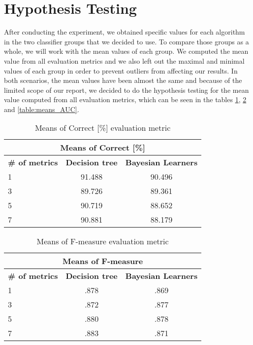 \section{Hypothesis Testing}
After conducting the experiment, we obtained specific values for each algorithm in the two classifier groups that we decided to use. To compare those groups as a whole, we will work with the mean values of each group. We computed the mean value from all evaluation metrics and we also left out the maximal and minimal values of each group in order to prevent outliers from affecting our results. In both scenarios, the mean values have been almost the same and because of the limited scope of our report, we decided to do the hypothesis testing for the mean value computed from all evaluation metrics, which can be seen in the tables \ref{table:means_correct}, \ref{table:means_F-measure} and \ref{table:means_AUC}.
\begin{table}[h!]
\centering
\begin{tabular}{ |l|c|c| }
\hline
\multicolumn{3}{|c|}{\textbf{Means of Correct [\%]}}\\
 \hline
 \textbf{\# of metrics} & \textbf{Decision tree} & \textbf{Bayesian Learners}  \\
 \hline
 1 & 91.488 & 90.496\\
 \hline
 3 &  89.726 & 89.361\\
 \hline
 5 & 90.719 & 88.652\\
 \hline
 7 & 90.881 &  88.179\\
 \hline
\end{tabular}
\caption{Means of Correct [\%] evaluation metric}
\label{table:means_correct}
\end{table} 

\begin{table}[h!]
\centering
\begin{tabular}{ |l|c|c| }
 \hline
 \multicolumn{3}{|c|}{\textbf{Means of F-measure}}\\ \hline
 \textbf{\# of metrics} & \textbf{Decision tree} & \textbf{Bayesian Learners}  \\
 \hline
 1 & .878 & .869\\
 \hline
 3 &  .872 & .877\\
 \hline
 5 & .880 & .878\\
 \hline
 7 & .883 &  .871\\
 \hline
\end{tabular}
\caption{Means of F-measure evaluation metric}
\label{table:means_F-measure}
\end{table} 

